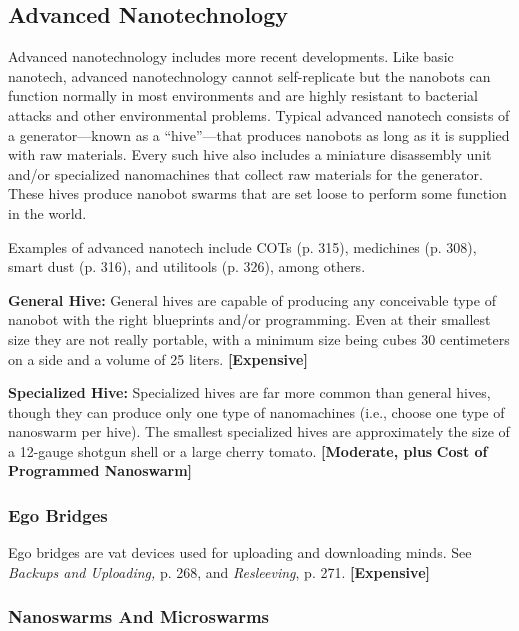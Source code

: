 \subsection{Advanced Nanotechnology}

Advanced nanotechnology includes more recent 
developments. Like basic nanotech, advanced nanotechnology
cannot self-replicate but the nanobots
can function normally in most environments and are 
highly resistant to bacterial attacks and other environmental
problems. Typical advanced nanotech consists
of a generator—known as a ``hive''—that produces 
nanobots as long as it is supplied with raw materials. 
Every such hive also includes a miniature disassembly 
unit and/or specialized nanomachines that collect 
raw materials for the generator. These hives produce 
nanobot swarms that are set loose to perform some 
function in the world.

Examples of advanced nanotech include COTs (p. 
315), medichines (p. 308), smart dust (p. 316), and 
utilitools (p. 326), among others.

\textbf{General Hive:} General hives are capable of producing
any conceivable type of nanobot with the right
blueprints and/or programming. Even at their smallest 
size they are not really portable, with a minimum size 
being cubes 30 centimeters on a side and a volume of 
25 liters. \textbf{[Expensive]}

\textbf{Specialized Hive:} Specialized hives are far more 
common than general hives, though they can produce 
only one type of nanomachines (i.e., choose one type 
of nanoswarm per hive). The smallest specialized 
hives are approximately the size of a 12-gauge shotgun
shell or a large cherry tomato. \textbf{[Moderate, plus }
\textbf{Cost of Programmed Nanoswarm]}

\subsubsection{Ego Bridges}

Ego bridges are vat devices used for uploading and 
downloading minds. See \textit{Backups and Uploading,} p. 268, 
and \textit{Resleeving}, p. 271. \textbf{[Expensive]}

\subsubsection{Nanoswarms And Microswarms}

